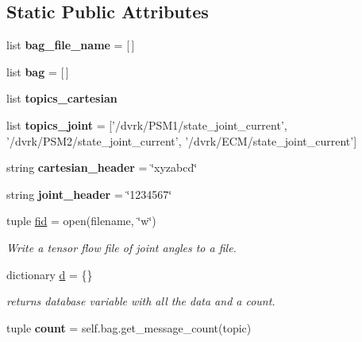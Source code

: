 \subsection*{Static Public Attributes}
\begin{DoxyCompactItemize}
\item 
\hypertarget{classConvertBags_1_1ConvertBags_a285d5e73b6d3ddb248dadb7342ec0134}{list {\bfseries bag\-\_\-file\-\_\-name} = \mbox{[}$\,$\mbox{]}}\label{classConvertBags_1_1ConvertBags_a285d5e73b6d3ddb248dadb7342ec0134}

\item 
\hypertarget{classConvertBags_1_1ConvertBags_afbb97b84df21d7ad91ffd02668e79f0f}{list {\bfseries bag} = \mbox{[}$\,$\mbox{]}}\label{classConvertBags_1_1ConvertBags_afbb97b84df21d7ad91ffd02668e79f0f}

\item 
list {\bfseries topics\-\_\-cartesian}
\item 
\hypertarget{classConvertBags_1_1ConvertBags_a38547d35c95a25ea2bfb2f54eb7442c2}{list {\bfseries topics\-\_\-joint} = \mbox{[}'/dvrk/P\-S\-M1/state\-\_\-joint\-\_\-current', '/dvrk/P\-S\-M2/state\-\_\-joint\-\_\-current', '/dvrk/E\-C\-M/state\-\_\-joint\-\_\-current'\mbox{]}}\label{classConvertBags_1_1ConvertBags_a38547d35c95a25ea2bfb2f54eb7442c2}

\item 
\hypertarget{classConvertBags_1_1ConvertBags_a985ecbb4c19b14384d48c67847744ad0}{string {\bfseries cartesian\-\_\-header} = \char`\"{}xyzabcd\char`\"{}}\label{classConvertBags_1_1ConvertBags_a985ecbb4c19b14384d48c67847744ad0}

\item 
\hypertarget{classConvertBags_1_1ConvertBags_a97debd757cbccee47557d88a3a191944}{string {\bfseries joint\-\_\-header} = \char`\"{}1234567\char`\"{}}\label{classConvertBags_1_1ConvertBags_a97debd757cbccee47557d88a3a191944}

\item 
tuple \hyperlink{classConvertBags_1_1ConvertBags_a2628e3b073f3ab23e352246cef6e7888}{fid} = open(filename, \char`\"{}w\char`\"{})
\begin{DoxyCompactList}\small\item\em Write a tensor flow file of joint angles to a file. \end{DoxyCompactList}\item 
dictionary \hyperlink{classConvertBags_1_1ConvertBags_a615b423c353271da9d8372a2227e6d74}{d} = \{\}
\begin{DoxyCompactList}\small\item\em returns database variable with all the data and a count. \end{DoxyCompactList}\item 
\hypertarget{classConvertBags_1_1ConvertBags_a69351deeda422a856b9613678082bfc1}{tuple {\bfseries count} = self.\-bag.\-get\-\_\-message\-\_\-count(topic)}\label{classConvertBags_1_1ConvertBags_a69351deeda422a856b9613678082bfc1}


\end{DoxyCompactItemize}

